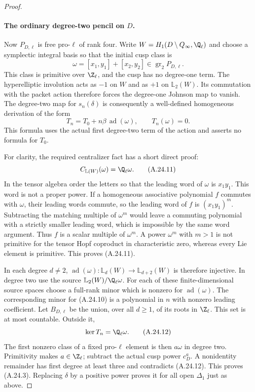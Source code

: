 \begin{proof}
\paragraph{The ordinary degree-two pencil on $D$.}
Now $P_{D,\ell}$ is free pro-$\ell$ of rank four. Write
$W=H_1(D\setminus Q_\infty,\Q_\ell)$ and choose a symplectic
integral basis so that the initial cusp class is
\[
                 \omega=[x_1,y_1]+[x_2,y_2]
                      \in\operatorname{gr}_2P_{D,\ell}.
\]
This class is primitive over $\Z_\ell$, and the cusp has
no degree-one term. The hyperelliptic involution acts as
$-1$ on $W$ and as $+1$ on $\mathbb L_2(W)$.
Its commutation with the packet action therefore forces
the degree-one Johnson map to vanish. The degree-two map
for $s_n(\delta)$ is consequently a well-defined
homogeneous derivation of the form
\[
          T_n=T_0+n\beta\,\operatorname{ad}(\omega),
                         \qquad T_n(\omega)=0.           \tag{A.24.10}
\]
This formula uses the actual first degree-two term of the
action and asserts no formula for $T_0$.

For clarity, the required centralizer fact has a short
direct proof:
\[
                C_{\mathbb L(W)}(\omega)=\Q_\ell\omega.
                                                        \tag{A.24.11}
\]
In the tensor algebra order the letters so that the
leading word of $\omega$ is $x_1y_1$.
This word is not a proper power. If a homogeneous
associative polynomial $f$ commutes with $\omega$, their
leading words commute, so the leading word of $f$ is
$(x_1y_1)^m$. Subtracting the matching multiple of
$\omega^m$ would leave a commuting polynomial with a
strictly smaller leading word, which is impossible by
the same word argument. Thus $f$ is a scalar multiple of
$\omega^m$. A power $\omega^m$ with $m>1$ is not primitive
for the tensor Hopf coproduct in characteristic zero,
whereas every Lie element is primitive. This proves
(A.24.11).

In each degree $d\ne2$,
$\operatorname{ad}(\omega):\mathbb L_d(W)\to
\mathbb L_{d+2}(W)$ is therefore injective. In degree two
use the source $\mathbb L_2(W)/\Q_\ell\omega$.
For each of these finite-dimensional source spaces
choose a full-rank minor which is nonzero for
$\operatorname{ad}(\omega)$.
The corresponding minor for (A.24.10) is a polynomial
in $n$ with nonzero leading coefficient. Let $B_{D,\ell}$
be the union, over all $d\ge1$, of its roots in $\Z_\ell$.
This set is at most countable. Outside it,
\[
                         \ker T_n=\Q_\ell\omega.
                                                        \tag{A.24.12}
\]
The first nonzero class of a fixed pro-$\ell$ element is
then $a\omega$ in degree two. Primitivity makes
$a\in\Z_\ell$; subtract the actual cusp power $c_D^a$.
A nonidentity remainder has first degree at least three
and contradicts (A.24.12). This proves (A.24.3).
Replacing $\delta$ by a positive power proves it for
all open $\Delta_1$ just as above.


\end{proof}
